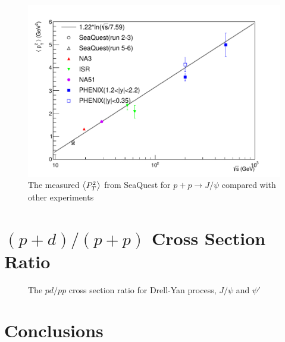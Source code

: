 \documentclass[twocolumn,aps,unsortedaddress,superscriptaddress,prd,floatfix,showpacs,linenumbers]{revtex4-2}
\begin{document}


\begin{figure}
	\centering
	\includegraphics[width=\linewidth]{crossSections/pT/pT_s_release}
	\caption{The measured $\expval{P_T^2}$ from SeaQuest for $p+p\rightarrow J/\psi$ compared with other experiments }
	\label{fig:pt_s}
\end{figure}

\section{$(p+d)/(p+p)$ Cross Section Ratio}
\label{sec:CSR}
\begin{figure}
	\caption{The $pd/pp$ cross section ratio for Drell-Yan process, $J/\psi$ and $\psi'$}
	\label{fig:pd/pp_csr}
\end{figure}

\section{Conclusions}
\label{sec:Conclusions}

\nocite{*}

\end{document}
